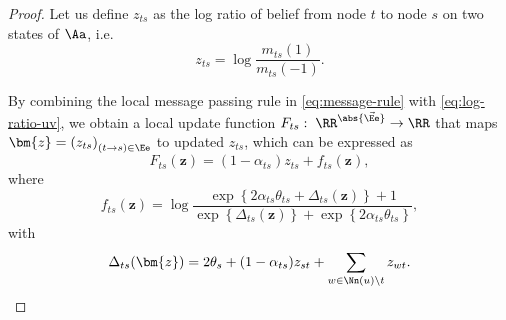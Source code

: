 \begin{proof}
  Let us define $z_{ts}$ as the log ratio of belief from node $t$ to node $s$ on two states of $\Aa$, i.e.
  \begin{equation}\label{eq:log-ratio-uv}
    z_{ts} = \log\frac{m_{ts}(1)}{m_{ts}(-1)}.
  \end{equation}

  By combining the local message passing rule in \eqref{eq:message-rule} with \eqref{eq:log-ratio-uv}, we obtain a local update function $F_{ts}: \; \RR^{\abs{\vec{\Ee}}} \rightarrow \RR$ that maps $\bm{z} = \left( z_{ts} \right)_{(t \rightarrow s) \in \Ee}$ to updated $z_{ts}$, which can be expressed as
  \begin{equation}\label{eq:ratio-update}
    F_{ts}(\bm{z}) = (1-\alpha_{ts}) z_{ts} + f_{ts}(\bm{z}),
  \end{equation}
  where
  \begin{equation}
    f_{ts}(\bm{z}) = \log\frac{\exp\left\{ 2 \alpha_{ts} \theta_{ts} + \Delta_{ts}(\bm{z}) \right\}+1}
    {\exp\left\{ \Delta_{ts}(\bm{z}) \right\} +
      \exp\left\{ 2 \alpha_{ts} \theta_{ts} \right\}},
  \end{equation}
  with
  \begin{equation}
    \Delta_{ts}(\bm{z}) = 2 \theta_s + (1 - \alpha_{ts}) z_{st} + \sum_{w\in \Nn(u)\backslash t} z_{wt}.
  \end{equation}


\end{proof}
